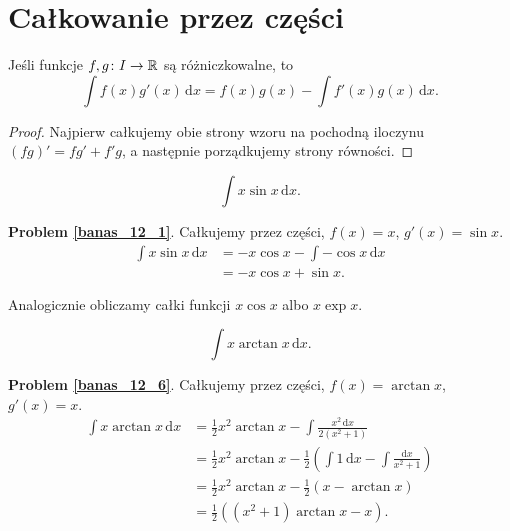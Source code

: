%

\section{Całkowanie przez części}

\begin{proposition}
\label{prp_int_by_parts}%
    Jeśli funkcje $f, g \colon I \to {\mathbb R}$ są różniczkowalne, to
    \begin{equation}
        \int f(x) g'(x) \,\mathrm{d}x = f(x) g(x) - \int f'(x) g(x) \,\mathrm{d} x.
    \end{equation}
\end{proposition}

\begin{proof}
    Najpierw całkujemy obie strony wzoru na pochodną iloczynu $(fg)' = fg' + f'g$, a następnie porządkujemy strony równości.
\end{proof}

\begin{problem_with_solution}
    \label{banas_12_1}%
    \begin{equation}
        \int x \sin x \,\mathrm{d} x.
    \end{equation}
\end{problem_with_solution}

\textbf{Problem \ref{banas_12_1}}.
Całkujemy przez części, $f(x) = x$, $g'(x) = \sin x$.
\begin{align}
    \int x \sin x \,\mathrm{d} x & = -x \cos x - \int - \cos x \, \mathrm{d}x \\
                                 & = -x \cos x + \sin x.
\end{align}

Analogicznie obliczamy całki funkcji $x \cos x$ albo $x \exp x$.

\begin{problem_with_solution}
    \label{banas_12_6}%
    \begin{equation}
        \int x \arctan x \,\mathrm{d} x.
    \end{equation}
\end{problem_with_solution}

\textbf{Problem \ref{banas_12_6}}.
Całkujemy przez części, $f(x) = \arctan x$, $g'(x) = x$.
\begin{align}
    \int x \arctan x \, \mathrm{d} x
    & = \frac 12 x^2 \arctan x - \int \frac{x^2 \,\mathrm{d}x}{2(x^2+1)} \\
    & = \frac 12 x^2 \arctan x - \frac 12 \left(\int 1 \,\mathrm{d}x - \int \frac{\mathrm{d}x}{x^2+1} \right) \\
    & = \frac 12 x^2 \arctan x - \frac 12 \left(x - \arctan x \right) \\
    & = \frac 12 \left((x^2+1)\arctan x - x \right).
\end{align}

